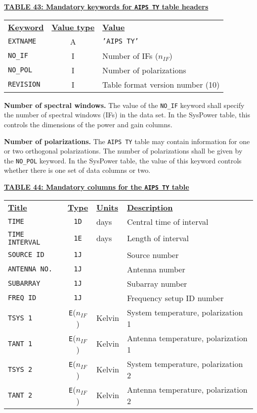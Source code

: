 \documentclass[twoside]{article}
\newcommand{\nif}{$n_{IF}$}
\begin{document}
\begin{center}
\underline{\bf{TABLE 43: Mandatory keywords for {\tt AIPS TY} table
    headers}}\\
\begin{tabular}{lcl}
\noalign{\vspace{2pt}} \label{ta:TYkeys}
\underline{{\bf Keyword}} & \underline{\bf{Value type}} &
    \underline{\bf{Value\vphantom{y}}} \\
\noalign{\vspace{2pt}}
{\tt EXTNAME}   & A & {\tt 'AIPS TY'}  \\
{\tt NO\_IF}    & I & Number of IFs (\nif)\\
{\tt NO\_POL}   & I & Number of polarizations \\
{\tt REVISION}  & I & Table format version number (10)
\end{tabular}
\end{center}

{\bf Number of spectral windows.} The value of the {\tt NO\_IF}
keyword shall specify the number of spectral windows (IFs) in the data
set.  In the SysPower table, this controls the dimensions of the
power and gain columns.

{\bf Number of polarizations.}  The {\tt AIPS TY} table may contain
information for one or two orthogonal polarizations.  The number of
polarizations shall be given by the {\tt NO\_POL} keyword.   In the
SysPower table, the value of this keyword controls whether there is
one set of data columns or two.

\begin{center}
\underline{\bf{TABLE 44: Mandatory columns for the {\tt AIPS TY} table}}\\
\begin{tabular}{lcll}
\noalign{\vspace{2pt}} \label{ta:TYcols}
\underline{{\bf Title\vphantom{y}}} & \underline{\bf{Type}} &
   \underline{{\bf Units\vphantom{y}}} & \underline{\bf{Description}} \\
\noalign{\vspace{2pt}}
{\tt TIME}          & {\tt 1D} & days & Central time of interval \\
{\tt TIME INTERVAL} & {\tt 1E} & days & Length of interval \\
{\tt SOURCE ID}     & {\tt 1J} &      & Source number \\
{\tt ANTENNA NO.}   & {\tt 1J} &      & Antenna number \\
{\tt SUBARRAY}      & {\tt 1J} &      & Subarray number \\
{\tt FREQ ID}       & {\tt 1J} &      & Frequency setup ID number \\
{\tt TSYS 1}        & {\tt E}(\nif) & Kelvin & System temperature, polarization 1\\
{\tt TANT 1}        & {\tt E}(\nif) & Kelvin & Antenna temperature, polarization 1 \\
\hline
{\tt TSYS 2}        & {\tt E}(\nif) & Kelvin & System temperature, polarization 2\\
{\tt TANT 2}        & {\tt E}(\nif) & Kelvin & Antenna temperature, polarization 2
\end{tabular}
\end{center}
\end{document}
